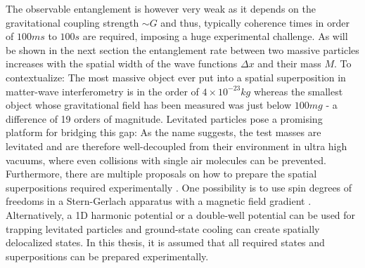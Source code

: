 The observable entanglement is however very weak as it depends on the gravitational coupling strength $\sim G$ and thus, typically coherence times in order of $100\si{ms}$ to $100\si{s}$ are required, imposing a huge experimental challenge.
As will be shown in the next section the entanglement rate between two massive particles increases with the spatial width of the wave functions $\Delta x$ and their mass $M$.
To contextualize: The most massive object ever put into a spatial superposition in matter-wave interferometry is in the order of $4\times 10^{-23}\si{kg}$ \cite{Fein_2019} whereas the smallest object whose gravitational field has been measured was just below $100\si{mg}$ \cite{Westphal_2021} - a difference of 19 orders of magnitude.
Levitated particles pose a promising platform for bridging this gap: As the name suggests, the test masses are levitated and are therefore well-decoupled from their environment in ultra high vacuums, where even collisions with single air molecules can be prevented.
Furthermore, there are multiple proposals on how to prepare the spatial superpositions required experimentally \cite{Bose_2017,Krisnanda_2020,Marletto_2017}.
One possibility is to use spin degrees of freedoms in a Stern-Gerlach apparatus with a magnetic field gradient \cite{Bose_2017}.
Alternatively, a 1D harmonic potential \cite{Krisnanda_2020} or a double-well potential can be used for trapping levitated particles and ground-state cooling can create spatially delocalized states.
In this thesis, it is assumed that all required states and superpositions can be prepared experimentally.

